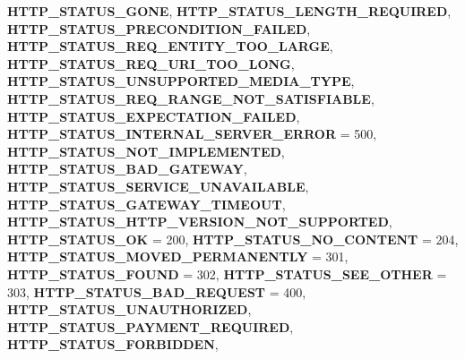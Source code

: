 \begin{DoxyCompactItemize}
{\bfseries H\+T\+T\+P\+\_\+\+S\+T\+A\+T\+U\+S\+\_\+\+G\+O\+NE}, 
{\bfseries H\+T\+T\+P\+\_\+\+S\+T\+A\+T\+U\+S\+\_\+\+L\+E\+N\+G\+T\+H\+\_\+\+R\+E\+Q\+U\+I\+R\+ED}, 
{\bfseries H\+T\+T\+P\+\_\+\+S\+T\+A\+T\+U\+S\+\_\+\+P\+R\+E\+C\+O\+N\+D\+I\+T\+I\+O\+N\+\_\+\+F\+A\+I\+L\+ED}, 
{\bfseries H\+T\+T\+P\+\_\+\+S\+T\+A\+T\+U\+S\+\_\+\+R\+E\+Q\+\_\+\+E\+N\+T\+I\+T\+Y\+\_\+\+T\+O\+O\+\_\+\+L\+A\+R\+GE}, 
\newline
{\bfseries H\+T\+T\+P\+\_\+\+S\+T\+A\+T\+U\+S\+\_\+\+R\+E\+Q\+\_\+\+U\+R\+I\+\_\+\+T\+O\+O\+\_\+\+L\+O\+NG}, 
{\bfseries H\+T\+T\+P\+\_\+\+S\+T\+A\+T\+U\+S\+\_\+\+U\+N\+S\+U\+P\+P\+O\+R\+T\+E\+D\+\_\+\+M\+E\+D\+I\+A\+\_\+\+T\+Y\+PE}, 
{\bfseries H\+T\+T\+P\+\_\+\+S\+T\+A\+T\+U\+S\+\_\+\+R\+E\+Q\+\_\+\+R\+A\+N\+G\+E\+\_\+\+N\+O\+T\+\_\+\+S\+A\+T\+I\+S\+F\+I\+A\+B\+LE}, 
{\bfseries H\+T\+T\+P\+\_\+\+S\+T\+A\+T\+U\+S\+\_\+\+E\+X\+P\+E\+C\+T\+A\+T\+I\+O\+N\+\_\+\+F\+A\+I\+L\+ED}, 
\newline
{\bfseries H\+T\+T\+P\+\_\+\+S\+T\+A\+T\+U\+S\+\_\+\+I\+N\+T\+E\+R\+N\+A\+L\+\_\+\+S\+E\+R\+V\+E\+R\+\_\+\+E\+R\+R\+OR} = 500, 
{\bfseries H\+T\+T\+P\+\_\+\+S\+T\+A\+T\+U\+S\+\_\+\+N\+O\+T\+\_\+\+I\+M\+P\+L\+E\+M\+E\+N\+T\+ED}, 
{\bfseries H\+T\+T\+P\+\_\+\+S\+T\+A\+T\+U\+S\+\_\+\+B\+A\+D\+\_\+\+G\+A\+T\+E\+W\+AY}, 
{\bfseries H\+T\+T\+P\+\_\+\+S\+T\+A\+T\+U\+S\+\_\+\+S\+E\+R\+V\+I\+C\+E\+\_\+\+U\+N\+A\+V\+A\+I\+L\+A\+B\+LE}, 
\newline
{\bfseries H\+T\+T\+P\+\_\+\+S\+T\+A\+T\+U\+S\+\_\+\+G\+A\+T\+E\+W\+A\+Y\+\_\+\+T\+I\+M\+E\+O\+UT}, 
{\bfseries H\+T\+T\+P\+\_\+\+S\+T\+A\+T\+U\+S\+\_\+\+H\+T\+T\+P\+\_\+\+V\+E\+R\+S\+I\+O\+N\+\_\+\+N\+O\+T\+\_\+\+S\+U\+P\+P\+O\+R\+T\+ED}, 
{\bfseries H\+T\+T\+P\+\_\+\+S\+T\+A\+T\+U\+S\+\_\+\+OK} = 200, 
{\bfseries H\+T\+T\+P\+\_\+\+S\+T\+A\+T\+U\+S\+\_\+\+N\+O\+\_\+\+C\+O\+N\+T\+E\+NT} = 204, 
\newline
{\bfseries H\+T\+T\+P\+\_\+\+S\+T\+A\+T\+U\+S\+\_\+\+M\+O\+V\+E\+D\+\_\+\+P\+E\+R\+M\+A\+N\+E\+N\+T\+LY} = 301, 
{\bfseries H\+T\+T\+P\+\_\+\+S\+T\+A\+T\+U\+S\+\_\+\+F\+O\+U\+ND} = 302, 
{\bfseries H\+T\+T\+P\+\_\+\+S\+T\+A\+T\+U\+S\+\_\+\+S\+E\+E\+\_\+\+O\+T\+H\+ER} = 303, 
{\bfseries H\+T\+T\+P\+\_\+\+S\+T\+A\+T\+U\+S\+\_\+\+B\+A\+D\+\_\+\+R\+E\+Q\+U\+E\+ST} = 400, 
\newline
{\bfseries H\+T\+T\+P\+\_\+\+S\+T\+A\+T\+U\+S\+\_\+\+U\+N\+A\+U\+T\+H\+O\+R\+I\+Z\+ED}, 
{\bfseries H\+T\+T\+P\+\_\+\+S\+T\+A\+T\+U\+S\+\_\+\+P\+A\+Y\+M\+E\+N\+T\+\_\+\+R\+E\+Q\+U\+I\+R\+ED}, 
{\bfseries H\+T\+T\+P\+\_\+\+S\+T\+A\+T\+U\+S\+\_\+\+F\+O\+R\+B\+I\+D\+D\+EN}, 

\end{DoxyCompactItemize}
